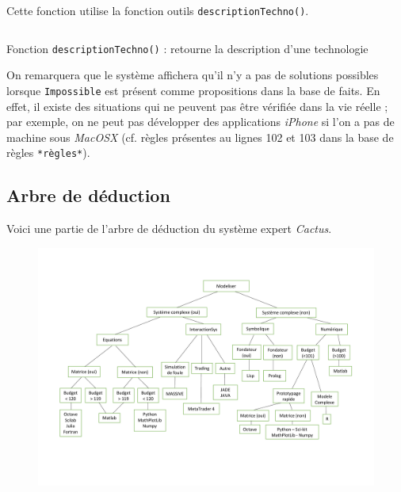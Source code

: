\documentclass[a4paper,12pt]{article}
\begin{document}
Cette fonction utilise la fonction outils \texttt{descriptionTechno()}.


\begin{listing}[H]
	\centering
	\inputminted[breaklines=true,linenos,firstline=12]{lisp}{../afficherPropositions.lisp}
	\caption{Fonction \texttt{descriptionTechno()} : retourne la description d'une technologie}
\end{listing}


On remarquera que le système affichera qu'il n'y a pas de solutions possibles lorsque \texttt{Impossible} est présent comme propositions dans la base de faits. En effet, il existe des situations qui ne peuvent pas être vérifiée dans la vie réelle ; par exemple, on ne peut pas développer des applications \textit{iPhone} si l'on a pas de machine sous \textit{MacOSX} (cf. règles présentes au lignes 102 et 103 dans la base de règles \texttt{*règles*}).

\newpage
	\subsection{Arbre de déduction}
	
	Voici une partie de l'arbre de déduction du système expert \textit{Cactus}.
	\begin{figure}[H]
		\centering
		\includegraphics[scale=0.6]{graph_deduction.pdf}
	\end{figure}
	
\end{document}
